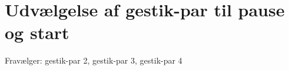 \section{Udvælgelse af gestik-par til pause og start}
\label{TestresultaterPauseStart}
%


Fravælger: gestik-par 2, gestik-par 3, gestik-par 4

